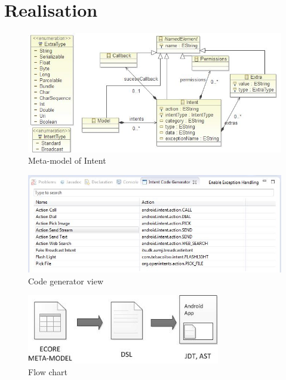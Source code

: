 \section{Realisation}

\begin{figure}[h!]
  \centering
    \includegraphics[width=\textwidth]{metamodel}
  \caption{Meta-model of Intent}
\end{figure}

\begin{figure}[h!]
  \centering
    \includegraphics[width=\textwidth]{codegenerator}
  \caption{Code generator view}
\end{figure}

\begin{figure}[h!]
  \centering
    \includegraphics[width=0.75\textwidth]{flowchart}
  \caption{Flow chart}
\end{figure}